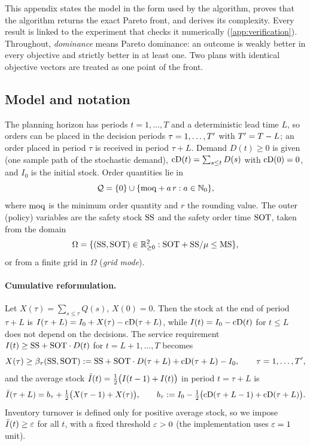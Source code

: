 \noindent
This appendix states the model in the form used by the algorithm, proves that the
algorithm returns the exact Pareto front, and derives its complexity. Every result
is linked to the experiment that checks it numerically (\cref{app:verification}).
Throughout, \emph{dominance} means Pareto dominance: an outcome is weakly better in
every objective and strictly better in at least one. Two plans with identical
objective vectors are treated as one point of the front.

\subsection{Model and notation}\label{app:model}

The planning horizon has periods $t=1,\dots,T$ and a deterministic lead time $L$, so
orders can be placed in the decision periods $\tau=1,\dots,T'$ with $T'=T-L$; an order
placed in period $\tau$ is received in period $\tau+L$. Demand $D(t)\ge 0$ is given
(one sample path of the stochastic demand), $\mathrm{cD}(t)=\sum_{s\le t}D(s)$ with
$\mathrm{cD}(0)=0$, and $I_0$ is the initial stock. Order quantities lie in
\begin{equation}
  \mathcal{Q}=\{0\}\cup\{\mathrm{moq}+a\,r : a\in\mathbb{N}_0\},
\end{equation}
where $\mathrm{moq}$ is the minimum order quantity and $r$ the rounding value. The outer
(policy) variables are the safety stock $\mathrm{SS}$ and the safety order time $\mathrm{SOT}$, taken
from the domain
\begin{equation}
  \Omega=\{(\mathrm{SS},\mathrm{SOT})\in\mathbb{R}^2_{\ge 0} : \mathrm{SOT}+\mathrm{SS}/\mu\le\mathrm{MS}\},
\end{equation}
or from a finite grid in $\Omega$ (\emph{grid mode}).

\paragraph{Cumulative reformulation.}
Let $X(\tau)=\sum_{s\le\tau}Q(s)$, $X(0)=0$. Then the stock at the end of period
$\tau+L$ is $I(\tau+L)=I_0+X(\tau)-\mathrm{cD}(\tau+L)$, while $I(t)=I_0-\mathrm{cD}(t)$ for
$t\le L$ does not depend on the decisions. The service requirement
$I(t)\ge\mathrm{SS}+\mathrm{SOT}\cdot D(t)$ for $t=L+1,\dots,T$ becomes
\begin{equation}\label{eq:req}
  X(\tau)\ge\beta_\tau(\mathrm{SS},\mathrm{SOT})
  :=\mathrm{SS}+\mathrm{SOT}\cdot D(\tau+L)+\mathrm{cD}(\tau+L)-I_0,\qquad \tau=1,\dots,T',
\end{equation}
and the average stock $\bar I(t)=\tfrac12\bigl(I(t-1)+I(t)\bigr)$ in period $t=\tau+L$ is
\begin{equation}\label{eq:ibar}
  \bar I(\tau+L)=b_\tau+\tfrac12\bigl(X(\tau-1)+X(\tau)\bigr),\qquad
  b_\tau:=I_0-\tfrac12\bigl(\mathrm{cD}(\tau+L-1)+\mathrm{cD}(\tau+L)\bigr).
\end{equation}
Inventory turnover is defined only for positive average stock, so we impose
$\bar I(t)\ge\varepsilon$ for all $t$, with a fixed threshold $\varepsilon>0$ (the implementation
uses $\varepsilon=1$ unit).

